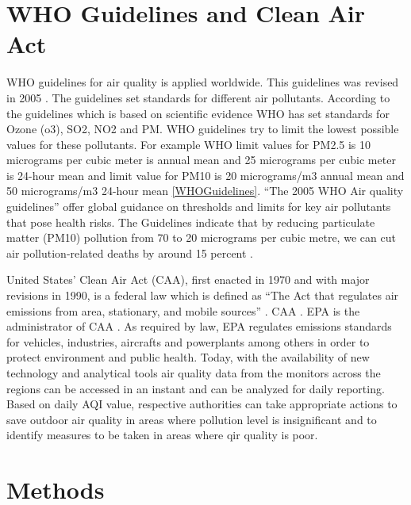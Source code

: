 \documentclass[sigconf]{acmart}
\begin{document}
\section{WHO Guidelines and Clean Air Act}
   WHO guidelines for air quality is applied worldwide. This guidelines was revised in 2005 \cite{www-who}. The guidelines set standards for different air pollutants. According to the guidelines which is based on scientific evidence WHO has set standards for Ozone (o3), SO2, NO2 and PM. WHO guidelines try to limit the lowest possible values for these pollutants. For example WHO limit values for PM2.5 is 10 micrograms per cubic meter is annual mean and 25 micrograms per cubic meter is 24-hour mean and limit value for PM10 is 20 micrograms/m3 annual mean and 50 micrograms/m3 24-hour mean \cite{www-who} \ref{WHOGuidelines}. ``The 2005 WHO Air quality guidelines'' offer global guidance on thresholds and limits for key air pollutants that pose health risks. The Guidelines indicate that by reducing particulate matter (PM10) pollution from 70 to 20 micrograms per cubic metre, we can cut air pollution-related deaths by around 15 percent \cite{www-who}.

   United States' Clean Air Act (CAA), first enacted in 1970 and with major revisions in 1990, is a federal law which is defined as ``The Act that regulates air emissions from area, stationary, and mobile sources'' \cite{epa-gov}. CAA  . EPA is the administrator of CAA \cite{wikipedia-org}. As required by law, EPA regulates emissions standards for vehicles, industries, aircrafts and powerplants among others in order to protect environment and public health. Today, with the availability of new technology and analytical tools air quality data from the monitors across the regions can be accessed in an instant and can be analyzed for daily reporting.
   Based on daily AQI value, respective authorities can take appropriate actions to save outdoor air quality in areas where pollution level is insignificant and to identify measures to be taken in areas where qir quality is poor.

\section{Methods}
\end{document}
